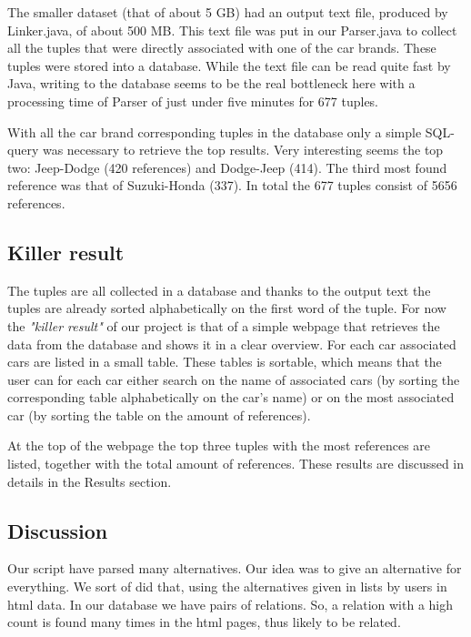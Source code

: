 \documentclass[a4paper,10pt]{article}
\begin{document}
The smaller dataset (that of about 5 GB) had an output text file, produced by Linker.java, of about 500 MB. This text file was put in our Parser.java to collect all the tuples that were directly associated with one of the car brands. These tuples were stored into a database. While the text file can be read quite fast by Java, writing to the database seems to be the real bottleneck here with a processing time of Parser of just under five minutes for 677 tuples.

With all the car brand corresponding tuples in the database only a simple SQL-query was necessary to retrieve the top results. Very interesting seems the top two: Jeep-Dodge (420 references) and Dodge-Jeep (414). The third most found reference was that of Suzuki-Honda (337). In total the 677 tuples consist of 5656 references.

\subsection{Killer result}
The tuples are all collected in a database and thanks to the output text the tuples are already sorted alphabetically on the first word of the tuple. For now the \emph{"killer result"} of our project is that of a simple webpage that retrieves the data from the database and shows it in a clear overview. For each car associated cars are listed in a small table. These tables is sortable, which means that the user can for each car either search on the name of associated cars (by sorting the corresponding table alphabetically on the car's name) or on the most associated car (by sorting the table on the amount of references).

At the top of the webpage the top three tuples with the most references are listed, together with the total amount of references. These results are discussed in details in the Results section.

\subsection{Discussion}
Our script have parsed many alternatives. Our idea was to give an alternative for everything. We sort of did that, using the alternatives given in lists by users in html data. In our database we have pairs of relations. So, a relation with a high count is found many times in the html pages, thus likely to be related. 
\end{document}
